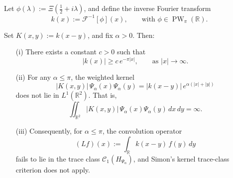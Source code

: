 \begin{lemma}
\label{lem:trace_class_failure_alpha_leq_pi}
Let \( \phi(\lambda) := \Xi\left( \tfrac{1}{2} + i\lambda \right) \), and define the inverse Fourier transform
\[
k(x) := \mathcal{F}^{-1}[\phi](x), \qquad \text{with } \phi \in \operatorname{PW}_\pi(\mathbb{R}).
\]

Set \( K(x,y) := k(x - y) \), and fix \( \alpha > 0 \). Then:
\begin{itemize}
    \item[\textup{(i)}] There exists a constant \( c > 0 \) such that
    \[
    |k(x)| \ge c\, e^{-\pi |x|}, \qquad \text{as } |x| \to \infty.
    \]

    \item[\textup{(ii)}] For any \( \alpha \le \pi \), the weighted kernel
    \[
    |K(x,y)|\, \Psi_\alpha(x)\Psi_\alpha(y) = |k(x - y)|\, e^{\alpha(|x| + |y|)}
    \]
    does not lie in \( L^1(\mathbb{R}^2) \). That is,
    \[
    \iint_{\mathbb{R}^2} |K(x,y)|\, \Psi_\alpha(x)\Psi_\alpha(y)\, dx\,dy = \infty.
    \]

    \item[\textup{(iii)}] Consequently, for \( \alpha \le \pi \), the convolution operator
    \[
    (L f)(x) := \int_{\mathbb{R}} k(x - y)\, f(y)\, dy
    \]
    fails to lie in the trace class \( \mathcal{C}_1(H_{\Psi_\alpha}) \), and Simon’s kernel trace-class criterion does not apply.
\end{itemize}
\end{lemma}
